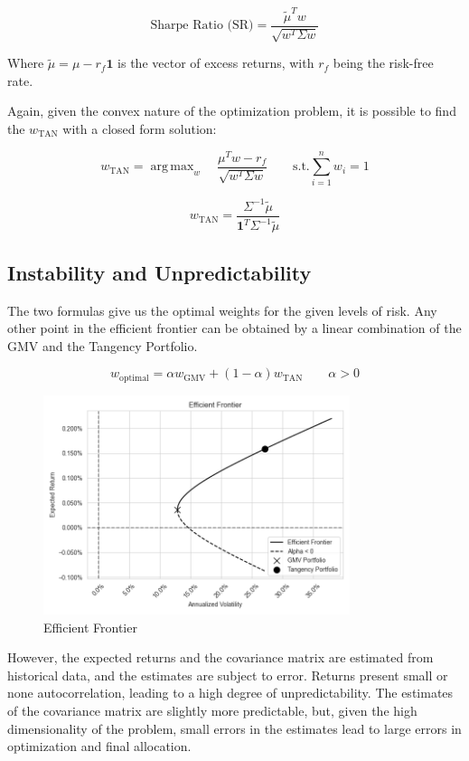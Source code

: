 \documentclass{article}
\DeclareMathOperator*{\argmax}{arg\,max}
\begin{document}
$$
\text{Sharpe Ratio (SR)} = \frac{\tilde{\mu}^{T} w}{\sqrt{w^{T} \Sigma w}}
$$

Where $\tilde{\mu} = \mu - r_f \mathbf{1}$ is the vector of excess returns, with $r_f$ being the risk-free rate.

Again, given the convex nature of the optimization problem, it is possible to find the $w_{\text{TAN}}$ with a closed form solution:

$$
w_{\text{TAN}} = \argmax_{w} \quad \frac{\mu^{T} w - r_f}{\sqrt{w^{T} \Sigma w}} \quad \quad
\text{s.t.} \sum_{i=1}^{n} w_{i} = 1
$$

$$
w_{\text{TAN}} = \frac{\Sigma^{-1} \tilde{\mu}}{\mathbf{1}^{T} \Sigma^{-1} \tilde{\mu}}
$$

\subsection{Instability and Unpredictability}
The two formulas give us the optimal weights for the given levels of risk. Any other point in the efficient frontier can be obtained by a linear combination of the GMV and the Tangency Portfolio.

$$
w_{\text{optimal}} = \alpha w_{\text{GMV}} + (1 - \alpha) w_{\text{TAN}} \quad \quad \alpha > 0
$$

\begin{figure}[h]
    \centering
    \includegraphics[width=0.8\textwidth]{graphics/illustrations/efficient_frontier.png}
    \caption{Efficient Frontier}
    \label{fig:efficient_frontier}
\end{figure}

However, the expected returns and the covariance matrix are estimated from historical data, and the estimates are subject to error. Returns present small or none autocorrelation, leading to a high degree of unpredictability. The estimates of the covariance matrix are slightly more predictable, but, given the high dimensionality of the problem, small errors in the estimates lead to large errors in optimization and final allocation.
\end{document}
